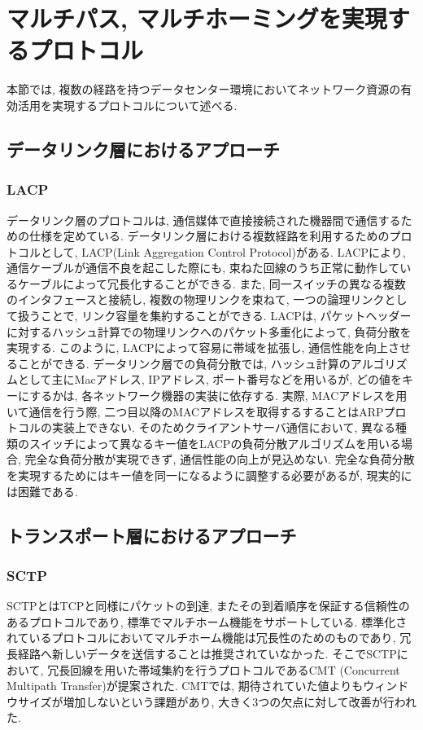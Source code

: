 \section{マルチパス, マルチホーミングを実現するプロトコル}
本節では, 複数の経路を持つデータセンター環境においてネットワーク資源の有効活用を実現するプロトコルについて述べる. 
\subsection{データリンク層におけるアプローチ}
\subsubsection{LACP}
データリンク層のプロトコルは, 通信媒体で直接接続された機器間で通信するための仕様を定めている. 
データリンク層における複数経路を利用するためのプロトコルとして, LACP(Link Aggregation Control
Protocol)がある\cite{lacp}.
LACPにより, 通信ケーブルが通信不良を起こした際にも, 束ねた回線のうち正常に動作しているケーブルによって冗長化することができる. 
また, 同一スイッチの異なる複数のインタフェースと接続し, 複数の物理リンクを束ねて,
一つの論理リンクとして扱うことで, リンク容量を集約することができる. 
LACPは, パケットヘッダーに対するハッシュ計算での物理リンクへのパケット多重化によって, 負荷分散を実現する. 
このように, LACPによって容易に帯域を拡張し, 通信性能を向上させることができる. 
データリンク層での負荷分散では, ハッシュ計算のアルゴリズムとして主にMacアドレス, IPアドレス, ポート番号などを用いるが, どの値をキーにするかは,
各ネットワーク機器の実装に依存する. 
実際, MACアドレスを用いて通信を行う際, 二つ目以降のMACアドレスを取得するすることはARPプロトコルの実装上できない\cite{arp}. 
そのためクライアントサーバ通信において, 異なる種類のスイッチによって異なるキー値をLACPの負荷分散アルゴリズムを用いる場合, 完全な負荷分散が実現できず,
通信性能の向上が見込めない.
完全な負荷分散を実現するためにはキー値を同一になるように調整する必要があるが, 現実的には困難である\cite{lacp_problem}.

\subsection{トランスポート層におけるアプローチ}

\subsubsection{SCTP}
SCTP\cite{sctp}とはTCPと同様にパケットの到達, またその到着順序を保証する信頼性のあるプロトコルであり,
標準でマルチホーム機能をサポートしている.
標準化されているプロトコルにおいてマルチホーム機能は冗長性のためのものであり, 冗長経路へ新しいデータを送信することは推奨されていなかった. 
そこでSCTPにおいて, 冗長回線を用いた帯域集約を行うプロトコルであるCMT (Concurrent Multipath
Transfer)が提案された\cite{cmt_1, cmt_2}. 
CMTでは, 期待されていた値よりもウィンドウサイズが増加しないという課題があり, 大きく3つの欠点に対して改善が行われた.  

